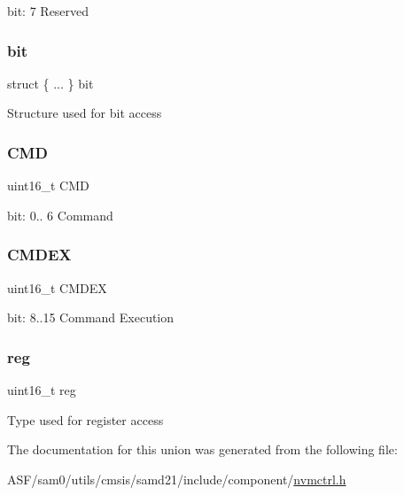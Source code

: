 bit\+: 7 Reserved \mbox{\label{union_n_v_m_c_t_r_l___c_t_r_l_a___type_ab6f9e1408e9adabde137007698ba412b}} 
\subsubsection{\texorpdfstring{bit}{bit}}
{\footnotesize\ttfamily struct \{ ... \}   bit}

Structure used for bit access \mbox{\label{union_n_v_m_c_t_r_l___c_t_r_l_a___type_a6cd9ec462f42ca73fcc999e944c712c5}} 
\subsubsection{\texorpdfstring{CMD}{CMD}}
{\footnotesize\ttfamily uint16\+\_\+t C\+MD}

bit\+: 0.. 6 Command \mbox{\label{union_n_v_m_c_t_r_l___c_t_r_l_a___type_abee22c89af9d5f931fec1cf074187b29}} 
\subsubsection{\texorpdfstring{CMDEX}{CMDEX}}
{\footnotesize\ttfamily uint16\+\_\+t C\+M\+D\+EX}

bit\+: 8..15 Command Execution \mbox{\label{union_n_v_m_c_t_r_l___c_t_r_l_a___type_a11760f5020019f4aa8cb02e694f7cc44}} 
\subsubsection{\texorpdfstring{reg}{reg}}
{\footnotesize\ttfamily uint16\+\_\+t reg}

Type used for register access 

The documentation for this union was generated from the following file\+:\begin{DoxyCompactItemize}
\item 
A\+S\+F/sam0/utils/cmsis/samd21/include/component/\mbox{\hyperlink{component_2nvmctrl_8h}{nvmctrl.\+h}}\end{DoxyCompactItemize}

